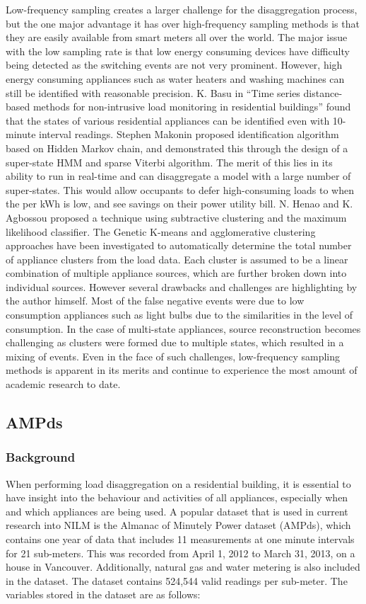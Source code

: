 \documentclass[12pt,twocolumn]{article}
\begin{document}
			Low-frequency sampling creates a larger challenge for the disaggregation process, but the one major advantage it has over high-frequency sampling methods is that they are easily available from smart meters all over the world. The major issue with the low sampling rate is that low energy consuming devices have difficulty being detected as the switching events are not very prominent. However, high energy consuming appliances such as water heaters and washing machines can still be identified with reasonable precision. K. Basu in ``Time series distance-based methods for non-intrusive load monitoring in residential buildings'' found that the states of various residential appliances can be identified even with 10-minute interval readings. Stephen Makonin proposed identification algorithm based on Hidden Markov chain, and demonstrated this through the design of a super-state HMM and sparse Viterbi algorithm. The merit of this lies in its ability to run in real-time and can disaggregate a model with a large number of super-states. This would allow occupants to defer high-consuming loads to when the per kWh is low, and see savings on their power utility bill. N. Henao and K. Agbossou proposed a technique using subtractive clustering and the maximum likelihood classifier. The Genetic K-means and agglomerative clustering approaches have been investigated to automatically determine the total number of appliance clusters from the load data. Each cluster is assumed to be a linear combination of multiple appliance sources, which are further broken down into individual sources. However several drawbacks and challenges are highlighting by the author himself. Most of the false negative events were due to low consumption appliances such as light bulbs due to the similarities in the level of consumption. In the case of multi-state appliances, source reconstruction becomes challenging as clusters were formed due to multiple states, which resulted in a mixing of events. Even in the face of such challenges, low-frequency sampling methods is apparent in its merits and continue to experience the most amount of academic research to date. 
			
		\subsection{AMPds}

			\subsubsection*{Background}
				\quad When performing load disaggregation on a residential building, it is essential to have insight into the behaviour and activities of all appliances, especially when and which appliances are being used. A popular dataset that is used in current research into NILM is the Almanac of Minutely Power dataset (AMPds), which contains one year of data that includes 11 measurements at one minute intervals for 21 sub-meters. This was recorded from April 1, 2012 to March 31, 2013, on a house in Vancouver. Additionally, natural gas and water metering is also included in the dataset. The dataset contains 524,544 valid readings per sub-meter. The variables stored in the dataset are as follows:
\end{document}
